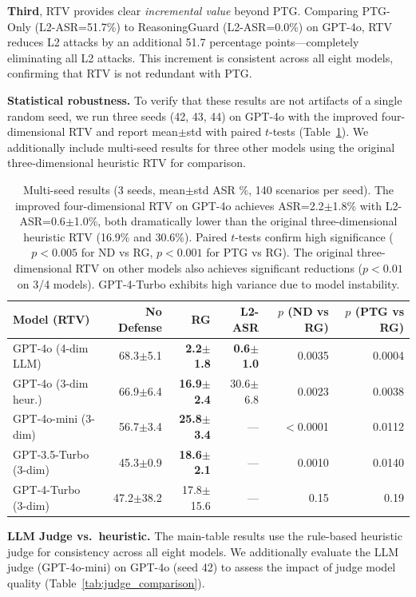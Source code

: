 \textbf{Third}, RTV provides clear \emph{incremental value} beyond PTG. Comparing PTG-Only (L2-ASR=51.7\%) to ReasoningGuard (L2-ASR=0.0\%) on GPT-4o, RTV reduces L2 attacks by an additional 51.7 percentage points---completely eliminating all L2 attacks. This increment is consistent across all eight models, confirming that RTV is not redundant with PTG.

\textbf{Statistical robustness.} To verify that these results are not artifacts of a single random seed, we run three seeds (42, 43, 44) on GPT-4o with the improved four-dimensional RTV and report mean$\pm$std with paired $t$-tests (Table~\ref{tab:multiseed}). We additionally include multi-seed results for three other models using the original three-dimensional heuristic RTV for comparison.

\begin{table}[htbp]
\centering\small
\begin{tabular}{lrrrrr}
\toprule
\textbf{Model (RTV)} & \textbf{No Defense} & \textbf{RG} & \textbf{L2-ASR} & \textbf{$p$ (ND vs RG)} & \textbf{$p$ (PTG vs RG)} \\
\midrule
GPT-4o (4-dim LLM)    & 68.3$\pm$5.1 & \textbf{2.2$\pm$1.8} & \textbf{0.6$\pm$1.0} & 0.0035 & 0.0004 \\
GPT-4o (3-dim heur.)   & 66.9$\pm$6.4 & \textbf{16.9$\pm$2.4} & 30.6$\pm$6.8 & 0.0023 & 0.0038 \\
GPT-4o-mini (3-dim)   & 56.7$\pm$3.4 & \textbf{25.8$\pm$3.4} & --- & $<$0.0001 & 0.0112 \\
GPT-3.5-Turbo (3-dim) & 45.3$\pm$0.9 & \textbf{18.6$\pm$2.1} & --- & 0.0010 & 0.0140 \\
GPT-4-Turbo (3-dim)   & 47.2$\pm$38.2 & 17.8$\pm$15.6 & --- & 0.15 & 0.19 \\
\bottomrule
\end{tabular}
\caption{Multi-seed results (3 seeds, mean$\pm$std ASR \%, 140 scenarios per seed). The improved four-dimensional RTV on GPT-4o achieves ASR=2.2$\pm$1.8\% with L2-ASR=0.6$\pm$1.0\%, both dramatically lower than the original three-dimensional heuristic RTV (16.9\% and 30.6\%). Paired $t$-tests confirm high significance ($p<0.005$ for ND vs RG, $p<0.001$ for PTG vs RG). The original three-dimensional RTV on other models also achieves significant reductions ($p<0.01$ on 3/4 models). GPT-4-Turbo exhibits high variance due to model instability.}
\label{tab:multiseed}
\end{table}

\textbf{LLM Judge vs.\ heuristic.} The main-table results use the rule-based heuristic judge for consistency across all eight models. We additionally evaluate the LLM judge (GPT-4o-mini) on GPT-4o (seed 42) to assess the impact of judge model quality (Table~\ref{tab:judge_comparison}).

